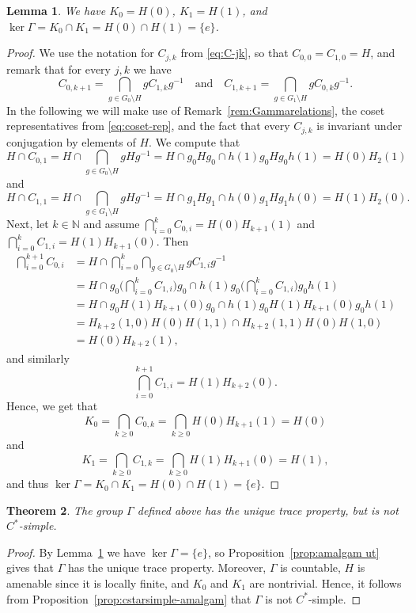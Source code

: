 \documentclass[a4paper]{amsart}
\theoremstyle{plain}
\newtheorem{theorem}{Theorem}
\newtheorem{lemma}[theorem]{Lemma}
\theoremstyle{definition}
\theoremstyle{remark}
\newcommand{\N}{\mathbb{N}}
\numberwithin{theorem}{section}
\begin{document}
\begin{lemma}\label{lem:Gamma-K0K1}
We have $K_0 = H(0)$, $K_1 = H(1)$, and $\ker\Gamma = K_0 \cap K_1 = H(0) \cap H(1) = \{e\}$.
\end{lemma}

\begin{proof}
We use the notation for $C_{j,k}$ from \eqref{eq:C-jk}, so that $C_{0,0}=C_{1,0}=H$,
and remark that for every $j,k$ we have
\[
C_{0,k+1}=\bigcap_{g\in G_0\setminus H}gC_{1,k}g^{-1}
\quad\text{and}\quad
C_{1,k+1}=\bigcap_{g\in G_1\setminus H}gC_{0,k}g^{-1}.
\]
In the following we will make use of Remark~\ref{rem:Gammarelations}, the coset representatives from \eqref{eq:coset-rep},
and the fact that every $C_{j,k}$ is invariant under conjugation by elements of $H$.
We compute that
\[
H \cap C_{0,1}
= H\cap\bigcap_{g\in G_0\setminus H}gHg^{-1}
= H \cap g_0Hg_0 \cap h(1)g_0Hg_0h(1)
= H(0)H_2(1)
\]
and
\[
H \cap C_{1,1}
= H\cap\bigcap_{g\in G_1\setminus H}gHg^{-1}
= H \cap g_1Hg_1 \cap h(0)g_1Hg_1h(0)
= H(1)H_2(0).
\]
Next, let $k\in\N$ and assume $\bigcap\limits_{i=0}^k C_{0,i}=H(0)H_{k+1}(1)$ and $\bigcap\limits_{i=0}^k C_{1,i}=H(1)H_{k+1}(0)$.
Then
\[
\begin{split}
\bigcap_{i=0}^{k+1} C_{0,i}
&= H\cap \bigcap_{i=0}^k \bigcap_{g\in G_0\setminus H} gC_{1,i}g^{-1} \\
&= H\cap g_0\Big(\bigcap_{i=0}^k C_{1,i}\Big)g_0 \cap h(1)g_0\Big(\bigcap_{i=0}^k C_{1,i}\Big)g_0h(1) \\
&= H\cap g_0H(1)H_{k+1}(0)g_0 \cap h(1)g_0H(1)H_{k+1}(0)g_0h(1) \\
&= H_{k+2}(1,0)H(0)H(1,1) \cap H_{k+2}(1,1)H(0)H(1,0) \\
&= H(0)H_{k+2}(1),
\end{split}
\]
and similarly
\[
\bigcap_{i=0}^{k+1} C_{1,i}=H(1)H_{k+2}(0).
\]
Hence, we get that
\[
K_0=\bigcap_{k\geq 0}C_{0,k}=\bigcap_{k\geq 0}H(0)H_{k+1}(1)=H(0)
\]
and
\[
K_1=\bigcap_{k\geq 0}C_{1,k}=\bigcap_{k\geq 0}H(1)H_{k+1}(0)=H(1),
\]
and thus $\ker\Gamma=K_0 \cap K_1=H(0)\cap H(1)=\{e\}$.
\end{proof} 

\begin{theorem}\label{thm:gamma-nonsimple}
The group $\Gamma$ defined above has the unique trace property, but is not $C^*$-simple.
\end{theorem}

\begin{proof}
By Lemma~\ref{lem:Gamma-K0K1} we have $\ker\Gamma=\{e\}$,
so Proposition~\ref{prop:amalgam ut} gives that $\Gamma$ has the unique trace property.
Moreover, $\Gamma$ is countable, $H$ is amenable since it is locally finite, and $K_0$ and $K_1$ are nontrivial.
Hence, it follows from Proposition~\ref{prop:cstarsimple-amalgam} that $\Gamma$ is not $C^*$-simple.
\end{proof}
\end{document}
